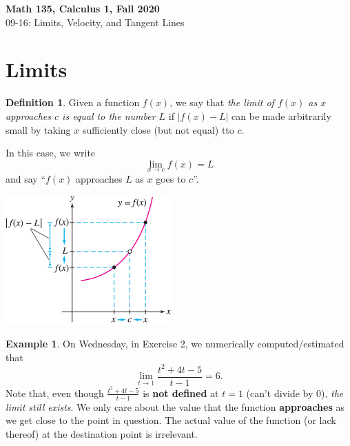 \documentclass[11pt,reqno,final]{amsart}
\numberwithin{equation}{section}
\numberwithin{figure}{section}
\theoremstyle{definition} %
\newtheorem*{definition*}{Definition}%
\newtheorem*{example*}{Example}%
\begin{document}
\onehalfspacing

\begin{center}
        \textbf{\Large Math 135, Calculus 1, Fall 2020}\\[10pt]
        {\large 09-16: Limits, Velocity, and Tangent Lines}
\end{center}

\thispagestyle{empty}

\renewcommand{\thesection}{\Alph{section}}

\section{Limits}

\begin{definition*}
        Given a function $f(x)$, we say that \textit{the limit of $f(x)$ as $x$ approaches $c$ is equal to the number $L$} if
        $|f(x)-L|$ can be made arbitrarily small by taking $x$ sufficiently close (but not equal) tto $c$.

        In this case, we write
        \[
                \lim_{x \to c}f(x) = L
        \]
        and say ``$f(x)$ approaches $L$ as $x$ goes to $c$''.
        \begin{center}
                \includegraphics[width=2.5in]{09-16P-lim.png}
        \end{center}
\end{definition*}

\begin{example*}
        On Wednesday, in Exercise 2, we numerically computed/estimated that
        \[
                \lim_{t \to 1}\dfrac{t^2+4t-5}{t-1} = 6.
        \]
        Note that, even though $\frac{t^2+4t-5}{t-1}$ is \textbf{not defined} at $t = 1$ (can't divide by 0), \textit{the limit still exists}.
        We only care about the value that the function \textbf{approaches} as we get close to the point in question.
        The actual value of the function (or lack thereof) at the destination point is irrelevant.
\end{example*}
\end{document}
